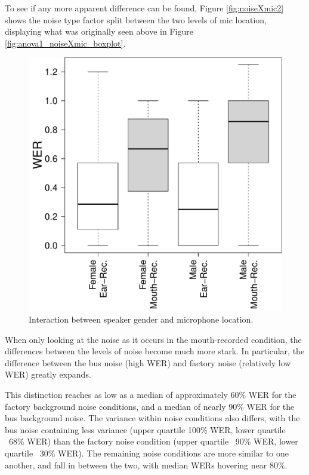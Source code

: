 \documentclass[dissertation,copyright]{uathesis}
\makeatletter
\def\maxwidth{ %
  \ifdim\Gin@nat@width>\linewidth
    \linewidth
  \else
    \Gin@nat@width
  \fi
}
\makeatother
\begin{document}
To see if any more apparent difference can be found, Figure \ref{fig:noiseXmic2} shows the noise type factor split between the two levels of mic location, displaying what was originally seen above in Figure \ref{fig:anova1_noiseXmic_boxplot}.  
%
\begin{figure}

\includegraphics[width=\maxwidth]{figure/spkr-gender_mic-location_interaction-1} 

\caption{Interaction between speaker gender and microphone location.}
\label{fig:spkr-genXmic-loc}
\end{figure}
%
When only looking at the noise as it occurs in the mouth-recorded condition, the differences between the levels of noise become much more stark.  In particular, the difference between the bus noise (high WER) and factory noise (relatively low WER) greatly expands. 

This distinction reaches as low as a median of approximately 60\% WER for the factory background noise conditions, and a median of nearly 90\% WER for the bus background noise.  The variance within noise conditions also differs, with the bus noise containing less variance (upper quartile 100\% WER, lower quartile ~68\% WER) than the factory noise condition (upper quartile ~90\% WER, lower quartile ~30\% WER).  The remaining noise conditions are more similar to one another, and fall in between the two, with median WERs hovering near 80\%.
\end{document}
